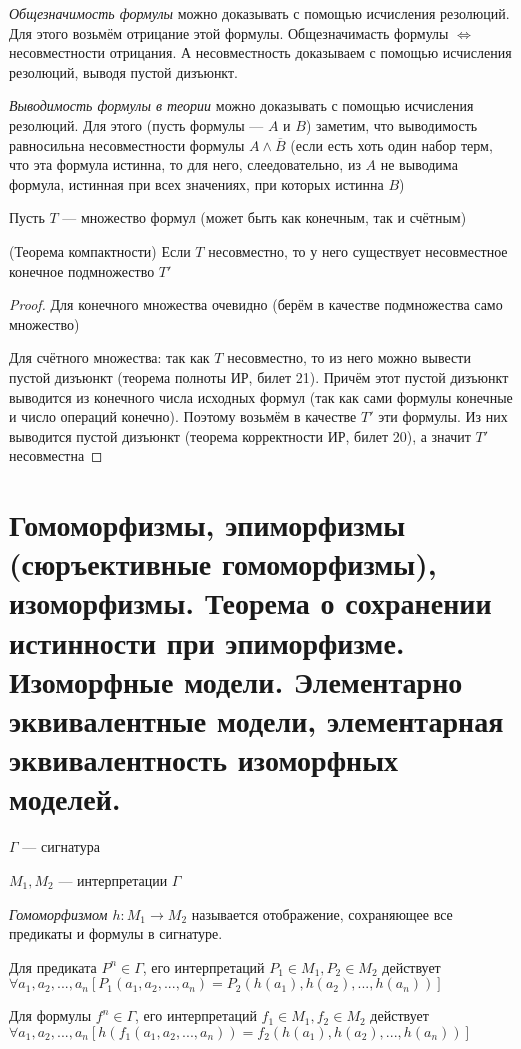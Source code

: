 \documentclass{article}
\begin{document}
\textit{Общезначимость формулы} можно доказывать с помощью исчисления резолюций. Для этого возьмём отрицание этой формулы. Общезначимасть формулы $\Leftrightarrow$ несовместности отрицания. А несовместность доказываем с помощью исчисления резолюций, выводя пустой дизъюнкт.

\textit{Выводимость формулы в теории} можно доказывать с помощью исчисления резолюций. Для этого (пусть формулы --- $A$ и $B$) заметим, что выводимость равносильна несовместности формулы $A \wedge \overline{B}$ (если есть хоть один набор терм, что эта формула истинна, то для него, слеедовательно, из $A$ не выводима формула, истинная при всех значениях, при которых истинна $B$)

Пусть $T$ --- множество формул (может быть как конечным, так и счётным)
\begin{theorem}{(Теорема компактности)}
	Если $T$ несовместно, то у него существует несовместное конечное подмножество $T'$
\end{theorem}

\begin{proof}
    Для конечного множества очевидно (берём в качестве подмножества само множество)

	Для счётного множества: так как $T$ несовместно, то из него можно вывести пустой дизъюнкт (теорема полноты ИР, билет 21). Причём этот пустой дизъюнкт выводится из конечного числа исходных формул (так как сами формулы конечные и число операций конечно). Поэтому возьмём в качестве $T'$ эти формулы. Из них выводится пустой дизъюнкт (теорема корректности ИР, билет 20), а значит $T'$ несовместна
\end{proof}

\section{Гомоморфизмы, эпиморфизмы (сюръективные гомоморфизмы), изоморфизмы. Теорема о сохранении истинности при эпиморфизме. Изоморфные модели. Элементарно эквивалентные модели, элементарная эквивалентность изоморфных моделей.}
$\Gamma$ --- сигнатура

$M_1, M_2$ --- интерпретации $\Gamma$
\begin{definition}
	\textit{Гомоморфизмом $h: M_1 \rightarrow M_2$} называется отображение, сохраняющее все предикаты и формулы в сигнатуре.

	Для предиката $P^n \in \Gamma$, его интерпретаций $P_1 \in M_1, P_2 \in M_2$ действует \\
	$\forall a_1, a_2,..., a_n[P_1(a_1, a_2,..., a_n) = P_2(h(a_1), h(a_2),..., h(a_n))]$

	Для формулы $f^n \in \Gamma$, его интерпретаций $f_1 \in M_1, f_2 \in M_2$ действует \\
	$\forall a_1, a_2,..., a_n[h(f_1(a_1, a_2,..., a_n)) = f_2(h(a_1), h(a_2),..., h(a_n))]$
\end{definition}
\end{document}
